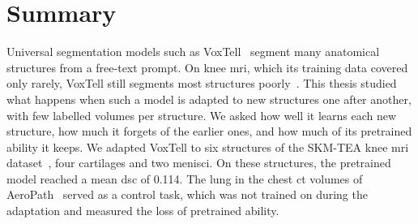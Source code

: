 %

\chapter{Summary}
\label{chap:summary}

Universal segmentation models such as VoxTell~\cite{rokuss2025voxtellfreetextpromptableuniversal} segment many anatomical structures from a free-text prompt.
On knee \gls{mri}, which its training data covered only rarely, VoxTell still segments most structures poorly~\cite[Suppl.~Table~9]{rokuss2025voxtellfreetextpromptableuniversal}.
This thesis studied what happens when such a model is adapted to new structures one after another, with few labelled volumes per structure.
We asked how well it learns each new structure, how much it forgets of the earlier ones, and how much of its pretrained ability it keeps.
We adapted VoxTell to six structures of the SKM-TEA knee \gls{mri} dataset~\cite{desai2021skmtea}, four cartilages and two menisci.
On these structures, the pretrained model reached a mean \gls{dsc} of 0.114.
The lung in the chest \gls{ct} volumes of AeroPath~\cite{støverud2023aeropathairwaysegmentationbenchmark} served as a control task, which was not trained on during the adaptation and measured the loss of pretrained ability.

